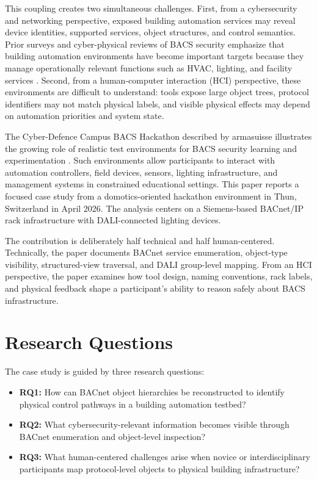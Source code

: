 \documentclass[10pt,conference]{IEEEtran}
\begin{document}
This coupling creates two simultaneous challenges. First, from a cybersecurity and networking perspective, exposed building automation services may reveal device identities, supported services, object structures, and control semantics. Prior surveys and cyber-physical reviews of BACS security emphasize that building automation environments have become important targets because they manage operationally relevant functions such as HVAC, lighting, and facility services \cite{graveto2022bacs,morales2024bas,li2023critical}. Second, from a human-computer interaction (HCI) perspective, these environments are difficult to understand: tools expose large object trees, protocol identifiers may not match physical labels, and visible physical effects may depend on automation priorities and system state.

The Cyber-Defence Campus BACS Hackathon described by armasuisse illustrates the growing role of realistic test environments for BACS security learning and experimentation \cite{armasuisse_bacs_2025}. Such environments allow participants to interact with automation controllers, field devices, sensors, lighting infrastructure, and management systems in constrained educational settings. This paper reports a focused case study from a domotics-oriented hackathon environment in Thun, Switzerland in April 2026. The analysis centers on a Siemens-based BACnet/IP rack infrastructure with DALI-connected lighting devices.

The contribution is deliberately half technical and half human-centered. Technically, the paper documents BACnet service enumeration, object-type visibility, structured-view traversal, and DALI group-level mapping. From an HCI perspective, the paper examines how tool design, naming conventions, rack labels, and physical feedback shape a participant's ability to reason safely about BACS infrastructure.

\section{Research Questions}

The case study is guided by three research questions:

\begin{itemize}
    \item \textbf{RQ1:} How can BACnet object hierarchies be reconstructed to identify physical control pathways in a building automation testbed?
    \item \textbf{RQ2:} What cybersecurity-relevant information becomes visible through BACnet enumeration and object-level inspection?
    \item \textbf{RQ3:} What human-centered challenges arise when novice or interdisciplinary participants map protocol-level objects to physical building infrastructure?
\end{itemize}
\end{document}
